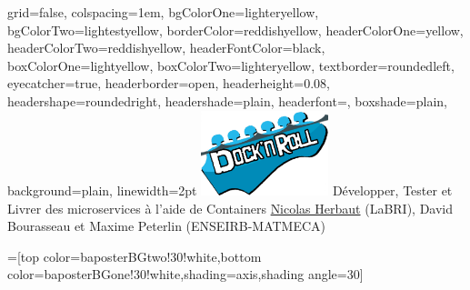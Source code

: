 \documentclass[portrait,final,a0paper]{baposter}
\begin{document}
\newlength{\leftimgwidth}
\begin{poster}%
  {
  grid=false,
  colspacing=1em,
  bgColorOne=lighteryellow,
  bgColorTwo=lightestyellow,
  borderColor=reddishyellow,
  headerColorOne=yellow,
  headerColorTwo=reddishyellow,
  headerFontColor=black,
  boxColorOne=lightyellow,
  boxColorTwo=lighteryellow,
  textborder=roundedleft,
  eyecatcher=true,
  headerborder=open,
  headerheight=0.08\textheight,
  headershape=roundedright,
  headershade=plain,
  headerfont=\Large\textsf, %
  boxshade=plain,
  background=plain,
  linewidth=2pt
  }
  {\includegraphics[width=10em]{docknroll}} %
  {\sf %
   Développer, Tester et Livrer des microservices   
   à l'aide de Containers}
  {\sf %
  \underline{Nicolas Herbaut} (LaBRI), David Bourasseau et Maxime Peterlin (ENSEIRB-MATMECA)
  }
  {%
  }

  =[top color=baposterBGtwo!30!white,bottom color=baposterBGone!30!white,shading=axis,shading angle=30]

     \setlength{\leftimgwidth}{0.78em+8.0em}


\end{poster}
\end{document}
